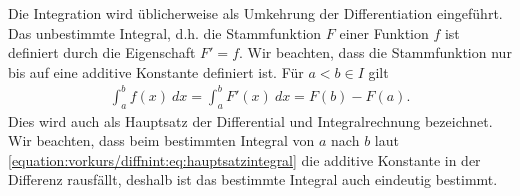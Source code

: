\documentclass[letterpaper,10pt,english]{jupyterBook}
\begin{document}
Die Integration wird üblicherweise als Umkehrung der Differentiation eingeführt. Das unbestimmte Integral, d.h. die Stammfunktion \(F\) einer Funktion \(f\) ist definiert durch die Eigenschaft \(F'=f\). Wir beachten, dass die Stammfunktion nur bis auf eine additive Konstante definiert ist. Für \(a < b \in I\) gilt
\begin{equation}\label{equation:vorkurs/diffnint:eq:hauptsatzintegral}
\begin{split}\int_a^b f(x) ~dx = \int_a^b F'(x) ~dx = F(b) - F(a). \end{split}
\end{equation}
Dies wird auch als Hauptsatz der Differential\sphinxhyphen{} und Integralrechnung bezeichnet. Wir beachten, dass beim bestimmten Integral von \(a\) nach \(b\) laut \eqref{equation:vorkurs/diffnint:eq:hauptsatzintegral} die additive Konstante in der Differenz rausfällt, deshalb ist das bestimmte Integral auch eindeutig bestimmt.
\end{document}
